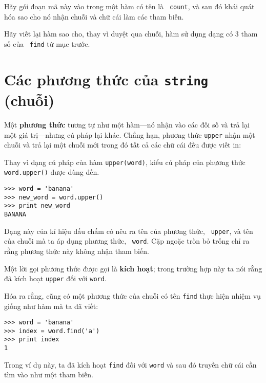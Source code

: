 \documentclass[11pt]{book}
\begin{document}
\begin{ex}

Hãy gói đoạn mã này vào trong một hàm có tên là {\tt
count}, và sau đó khái quát hóa sao cho nó nhận chuỗi và chữ cái
làm các tham biến.
\end{ex}

\begin{ex}
Hãy viết lại hàm sao cho, thay vì duyệt qua chuỗi, hàm sử dụng
dạng có 3 tham số của {\tt
find} từ mục trước.
\end{ex}


\section{Các phương thức của {\tt string} (chuỗi)}

Một {\bf phương thức} tương tự như một hàm---nó nhận vào các
đối số và trả lại một giá trị---nhưng cú pháp lại khác. Chẳng hạn,
phương thức {\tt upper} nhận một chuỗi và trả lại một chuỗi mới
trong đó tất cả các chữ cái đều được viết in:


Thay vì dạng cú pháp của hàm {\tt upper(word)}, kiểu
cú pháp của phương thức {\tt word.upper()} được dùng đến.


\beforeverb
\begin{verbatim}
>>> word = 'banana'
>>> new_word = word.upper()
>>> print new_word
BANANA
\end{verbatim}
\afterverb
%
Dạng này của kí hiệu dấu chấm có nêu ra tên của phương thức, {\tt
upper}, và tên của chuỗi mà ta áp dụng phương thức, {\tt
word}. Cặp ngoặc tròn bỏ trống chỉ ra rằng phương thức này không
nhận tham biến.


Một lời gọi phương thức được gọi là {\bf kích hoạt}; trong trường hợp
này ta nói rằng đã kích hoạt {\tt upper} đối với {\tt word}.


Hóa ra rằng, cũng có một phương thức của chuỗi có tên {\tt find} 
thực hiện nhiệm vụ giống như hàm mà ta đã viết:

\beforeverb
\begin{verbatim}
>>> word = 'banana'
>>> index = word.find('a')
>>> print index
1
\end{verbatim}
\afterverb
%
Trong ví dụ này, ta đã kích hoạt {\tt find} đối với {\tt word} và sau đó
truyền chữ cái cần tìm vào như một tham biến.
\end{document}

